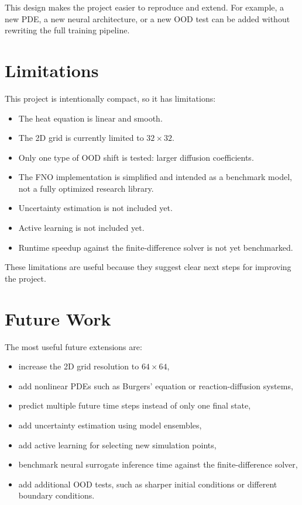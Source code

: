 \documentclass[11pt,a4paper]{article}
\begin{document}
This design makes the project easier to reproduce and extend. For example, a new PDE, a new neural architecture, or a new OOD test can be added without rewriting the full training pipeline.

\section{Limitations}

This project is intentionally compact, so it has limitations:
\begin{itemize}[leftmargin=*]
    \item The heat equation is linear and smooth.
    \item The 2D grid is currently limited to \(32 \times 32\).
    \item Only one type of OOD shift is tested: larger diffusion coefficients.
    \item The FNO implementation is simplified and intended as a benchmark model, not a fully optimized research library.
    \item Uncertainty estimation is not included yet.
    \item Active learning is not included yet.
    \item Runtime speedup against the finite-difference solver is not yet benchmarked.
\end{itemize}

These limitations are useful because they suggest clear next steps for improving the project.

\section{Future Work}

The most useful future extensions are:
\begin{itemize}[leftmargin=*]
    \item increase the 2D grid resolution to \(64 \times 64\),
    \item add nonlinear PDEs such as Burgers' equation or reaction-diffusion systems,
    \item predict multiple future time steps instead of only one final state,
    \item add uncertainty estimation using model ensembles,
    \item add active learning for selecting new simulation points,
    \item benchmark neural surrogate inference time against the finite-difference solver,
    \item add additional OOD tests, such as sharper initial conditions or different boundary conditions.
\end{itemize}
\end{document}
